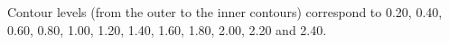 Contour levels (from the outer to the inner contours) correspond to 0.20, 0.40, 0.60, 0.80, 1.00, 1.20, 1.40, 1.60, 1.80, 2.00, 2.20 and 2.40.
